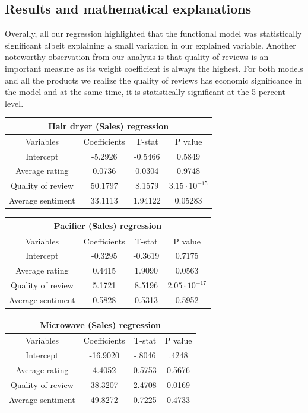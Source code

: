 \documentclass[reqno]{article}
\theoremstyle{definition}
\theoremstyle{definition}
\theoremstyle{remark}
\begin{document}
\subsection{Results and mathematical explanations}
Overally, all our regression highlighted that the functional model was statistically significant albeit explaining a small variation in our explained variable. Another noteworthy observation from our analysis is that quality of reviews is an important measure as its weight coefficient is always the highest. For both models and all the products we realize the quality of reviews has economic significance in the model and at the same time, it is statistically significant at the 5 percent level. 
\begin{center}
    \begin{tabular}{|c|c|c|c|}
    \hline
    \multicolumn{4}{|c|}{Hair dryer (Sales) regression}\\
    \hline
     Variables  & Coefficients & T-stat & P value\\
    \hline
    Intercept & -5.2926 & -0.5466& 0.5849\\
     Average rating  &  0.0736 & 0.0304& 0.9748\\
     Quality of review & 50.1797 & 8.1579 & $3.15\cdot10^{-15}$\\
     Average sentiment & 33.1113 & 1.94122 & 0.05283\\
     \hline
    \end{tabular}
\end{center}
\begin{center}
    \begin{tabular}{|c|c|c|c|}
    \hline
    \multicolumn{4}{|c|}{Pacifier (Sales) regression}\\
    \hline
     Variables  & Coefficients & T-stat & P value\\
    \hline
     Intercept & -0.3295 & -0.3619 & 0.7175\\
     Average rating  &  0.4415 & 1.9090& 0.0563\\
     Quality of review & 5.1721 & 8.5196 & $2.05\cdot10^{-17}$\\
     Average sentiment & 0.5828 & 0.5313 & 0.5952\\
     \hline
    \end{tabular}
\end{center}
\begin{center}
    \begin{tabular}{|c|c|c|c|}
    \hline
    \multicolumn{4}{|c|}{Microwave (Sales) regression}\\
    \hline
     Variables  & Coefficients & T-stat & P value\\
    \hline
    Intercept & -16.9020 & -.8046& .4248\\
     Average rating  &  4.4052 & 0.5753 & 0.5676 \\
     Quality of review & 38.3207 & 2.4708 & 0.0169\\
     Average sentiment & 49.8272& 0.7225 & 0.4733\\
     \hline
    \end{tabular}
\end{center}
\end{document}
